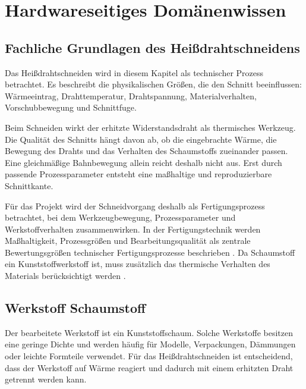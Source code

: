 
%
%
%

\chapter{Hardwareseitiges Domänenwissen}
\label{chap:domaenenwissen_hardware}

\section{Fachliche Grundlagen des Heißdrahtschneidens}
\label{sec:hardware_grundlagen_heissdrahtschneiden}

Das Heißdrahtschneiden wird in diesem Kapitel als technischer Prozess betrachtet. Es beschreibt die physikalischen Größen, die den Schnitt beeinflussen: Wärmeeintrag, Drahttemperatur, Drahtspannung, Materialverhalten, Vorschubbewegung und Schnittfuge.

Beim Schneiden wirkt der erhitzte Widerstandsdraht als thermisches Werkzeug. Die Qualität des Schnitts hängt davon ab, ob die eingebrachte Wärme, die Bewegung des Drahts und das Verhalten des Schaumstoffs zueinander passen. Eine gleichmäßige Bahnbewegung allein reicht deshalb nicht aus. Erst durch passende Prozessparameter entsteht eine maßhaltige und reproduzierbare Schnittkante.

Für das Projekt wird der Schneidvorgang deshalb als Fertigungsprozess betrachtet, bei dem Werkzeugbewegung, Prozessparameter und Werkstoffverhalten zusammenwirken. In der Fertigungstechnik werden Maßhaltigkeit, Prozessgrößen und Bearbeitungsqualität als zentrale Bewertungsgrößen technischer Fertigungsprozesse beschrieben \cite{Fritz:2022}. Da Schaumstoff ein Kunststoffwerkstoff ist, muss zusätzlich das thermische Verhalten des Materials berücksichtigt werden \cite{Bonnet:2025}.

\section{Werkstoff Schaumstoff}
\label{sec:hardware_werkstoff_schaumstoff}

Der bearbeitete Werkstoff ist ein Kunststoffschaum. Solche Werkstoffe besitzen eine geringe Dichte und werden häufig für Modelle, Verpackungen, Dämmungen oder leichte Formteile verwendet. Für das Heißdrahtschneiden ist entscheidend, dass der Werkstoff auf Wärme reagiert und dadurch mit einem erhitzten Draht getrennt werden kann.

